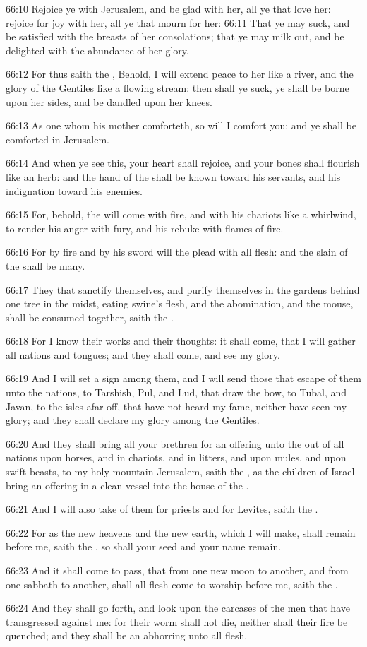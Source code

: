 66:10 Rejoice ye with Jerusalem, and be glad with her, all ye that love her: rejoice for joy with her, all ye that mourn for her: 66:11 That ye may suck, and be satisfied with the breasts of her consolations; that ye may milk out, and be delighted with the abundance of her glory.

66:12 For thus saith the \LORD, Behold, I will extend peace to her like a river, and the glory of the Gentiles like a flowing stream: then shall ye suck, ye shall be borne upon her sides, and be dandled upon her knees.

66:13 As one whom his mother comforteth, so will I comfort you; and ye shall be comforted in Jerusalem.

66:14 And when ye see this, your heart shall rejoice, and your bones shall flourish like an herb: and the hand of the \LORD shall be known toward his servants, and his indignation toward his enemies.

66:15 For, behold, the \LORD will come with fire, and with his chariots like a whirlwind, to render his anger with fury, and his rebuke with flames of fire.

66:16 For by fire and by his sword will the \LORD plead with all flesh: and the slain of the \LORD shall be many.

66:17 They that sanctify themselves, and purify themselves in the gardens behind one tree in the midst, eating swine's flesh, and the abomination, and the mouse, shall be consumed together, saith the \LORD.

66:18 For I know their works and their thoughts: it shall come, that I will gather all nations and tongues; and they shall come, and see my glory.

66:19 And I will set a sign among them, and I will send those that escape of them unto the nations, to Tarshish, Pul, and Lud, that draw the bow, to Tubal, and Javan, to the isles afar off, that have not heard my fame, neither have seen my glory; and they shall declare my glory among the Gentiles.

66:20 And they shall bring all your brethren for an offering unto the \LORD out of all nations upon horses, and in chariots, and in litters, and upon mules, and upon swift beasts, to my holy mountain Jerusalem, saith the \LORD, as the children of Israel bring an offering in a clean vessel into the house of the \LORD.

66:21 And I will also take of them for priests and for Levites, saith the \LORD.

66:22 For as the new heavens and the new earth, which I will make, shall remain before me, saith the \LORD, so shall your seed and your name remain.

66:23 And it shall come to pass, that from one new moon to another, and from one sabbath to another, shall all flesh come to worship before me, saith the \LORD.

66:24 And they shall go forth, and look upon the carcases of the men that have transgressed against me: for their worm shall not die, neither shall their fire be quenched; and they shall be an abhorring unto all flesh.

